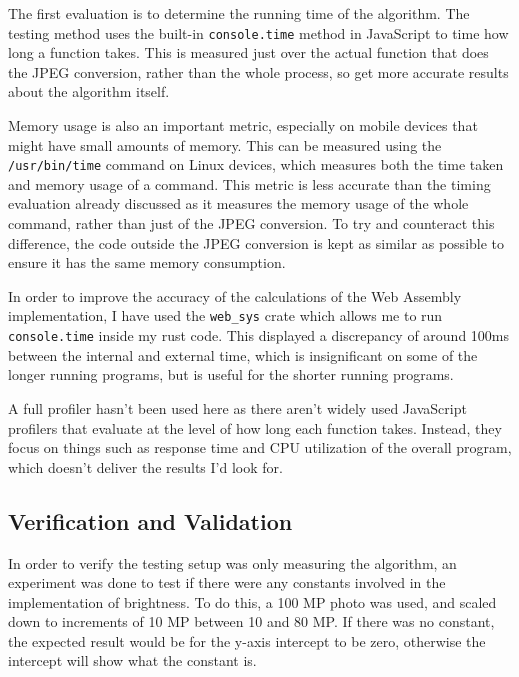 \documentclass[12pt,a4paper]{article}
\begin{document}
The first evaluation is to determine the running time of the algorithm. The testing method uses the built-in \texttt{console.time} method in JavaScript to time how long a function takes. This is measured just over the actual function that does the JPEG conversion, rather than the whole process, so get more accurate results about the algorithm itself.

Memory usage is also an important metric, especially on mobile devices that might have small amounts of memory. This can be measured using the \texttt{/usr/bin/time} command on Linux devices, which measures both the time taken and memory usage of a command. This metric is less accurate than the timing evaluation already discussed as it measures the memory usage of the whole command, rather than just of the JPEG conversion. To try and counteract this difference, the code outside the JPEG conversion is kept as similar as possible to ensure it has the same memory consumption.

In order to improve the accuracy of the calculations of the Web Assembly implementation, I have used the \texttt{web\_sys} crate which allows me to run \texttt{console.time} inside my rust code. This displayed a discrepancy of around 100ms between the internal and external time, which is insignificant on some of the longer running programs, but is useful for the shorter running programs.

A full profiler hasn't been used here as there aren't widely used JavaScript profilers that evaluate at the level of how long each function takes. Instead, they focus on things such as response time and CPU utilization of the overall program, which doesn't deliver the results I'd look for.

\subsection{Verification and Validation}

In order to verify the testing setup was only measuring the algorithm, an experiment was done to test if there were any constants involved in the implementation of brightness. To do this, a 100 MP photo was used, and scaled down to increments of 10 MP between 10 and 80 MP. If there was no constant, the expected result would be for the y-axis intercept to be zero, otherwise the intercept will show what the constant is.

\end{document}
